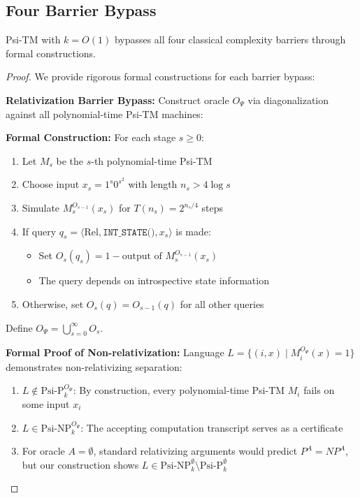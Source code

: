 \documentclass[11pt]{article}
\begin{document}
\subsection{Four Barrier Bypass}

\begin{theorem}
Psi-TM with $k = O(1)$ bypasses all four classical complexity barriers through formal constructions.
\end{theorem}

\begin{proof}
We provide rigorous formal constructions for each barrier bypass:

\textbf{Relativization Barrier Bypass:}
Construct oracle $O_\Psi$ via diagonalization against all polynomial-time Psi-TM machines:

\textbf{Formal Construction:}
For each stage $s \geq 0$:
\begin{enumerate}
\item Let $M_s$ be the $s$-th polynomial-time Psi-TM
\item Choose input $x_s = 1^s 0^{s^2}$ with length $n_s > 4 \log s$
\item Simulate $M_s^{O_{s-1}}(x_s)$ for $T(n_s) = 2^{n_s/4}$ steps
\item If query $q_s = \langle \text{Rel}, \texttt{INT\_STATE()}, x_s \rangle$ is made:
   \begin{itemize}
   \item Set $O_s(q_s) = 1 - \text{output of } M_s^{O_{s-1}}(x_s)$
   \item The query depends on introspective state information
   \end{itemize}
\item Otherwise, set $O_s(q) = O_{s-1}(q)$ for all other queries
\end{enumerate}
Define $O_\Psi = \bigcup_{s=0}^{\infty} O_s$.

\textbf{Formal Proof of Non-relativization:}
Language $L = \{(i, x) \mid M_i^{O_\Psi}(x) = 1\}$ demonstrates non-relativizing separation:

\begin{enumerate}
\item $L \notin \text{Psi-P}^{O_\Psi}_k$: By construction, every polynomial-time Psi-TM $M_i$ fails on some input $x_i$
\item $L \in \text{Psi-NP}^{O_\Psi}_k$: The accepting computation transcript serves as a certificate
\item For oracle $A = \emptyset$, standard relativizing arguments would predict $P^A = NP^A$, but our construction shows $L \in \text{Psi-NP}^{\emptyset}_k \setminus \text{Psi-P}^{\emptyset}_k$
\end{enumerate}


\end{proof}
\end{document}
